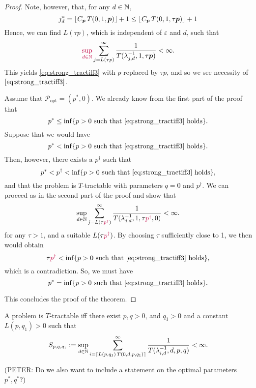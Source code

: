 \documentclass[11pt,a4paper]{article}
\newcommand{\peter}[1]{\begingroup\color{purple}#1\endgroup}
\begin{document}
\begin{proof}
Note, however, that, \peter{for any $d\in\mathbb{N}$,}
\[
 j_d^* = \lfloor C_{\boldsymbol{p}}\, T(0,1,\boldsymbol{p})\rfloor +1 \le \lfloor C_{\boldsymbol{p}}\, T(0,1,\tau \boldsymbol{p})\rfloor +1
\]
Hence, we can find $L(\tau p)$, which is independent of $\varepsilon$ and $d$, such that
\[
 \peter{\sup_{d\in\naturals}} \sum_{j=L(\tau p)}^\infty \frac{1}{T(\lambda_{j,d}^{-1},1, \tau \vp)}<\infty.
\]
This yields \eqref{eq:strong_tractiff3} with $p$ replaced by $\tau p$, and so we see necessity of $\eqref{eq:strong_tractiff3}$.


Assume that $\mathcal{P}_{\text{opt}}=(p^*,0)$. We already know from the first part of the proof that
\[
 p^* \le \inf\{p>0\ \mbox{such that \eqref{eq:strong_tractiff3} holds}\}.
\]
Suppose that we would have
\[
 p^* < \inf\{p>0\ \mbox{such that \eqref{eq:strong_tractiff3} holds}\}.
\]
\peter{Then, however, there exists a $p^\dag$ such that
\[
p^* < p^\dag < \inf\{p>0\ \mbox{such that \eqref{eq:strong_tractiff3} holds}\},
\]
and that the problem is $T$-tractable with parameters $q=0$ and $p^\dag$. }
We can proceed as in the second part of the proof and show that
\[
 \sup_{d\in\naturals} \sum_{j=L(\tau \peter{p^\dag})}^\infty \frac{1}{T(\lambda_{j,d}^{-1},1, \tau \peter{p^\dag},0)}<\infty.
\]
for any $\tau>1$, and a suitable $L(\tau \peter{p^\dag})$. By choosing $\tau$ sufficiently close to 1, we then would
obtain
\[
 \tau \peter{p^\dag} < \inf\{p>0\ \mbox{such that \eqref{eq:strong_tractiff3} holds}\},
\]
which is a contradiction. So, we must have
\[
 p^* = \inf\{p>0\ \mbox{such that \eqref{eq:strong_tractiff3} holds}\}.
\]

This concludes the proof of the theorem.

\end{proof}
\bigskip

\begin{theorem}\label{thm_main_tract2}
A problem is $T$-tractable iff there exist $p,q>0$, and $q_1>0$ and a constant $L(p,q_1) > 0$ such that
\begin{equation} \label{eq:tractiff4}
     S_{p,q,q_1}:=\sup_{d \in \mathbb{N}}
     \sum_{i = \lceil L(p,q_1)\, T(0,d,p,q_1) \rceil}^\infty \frac{1}{T(\lambda^{-1}_{i,d},d,p,q)}< \infty.
\end{equation}
\end{theorem}

\peter{(PETER: Do we also want to include a statement on the optimal parameters $p^*,q^*$?)}
\end{document}
